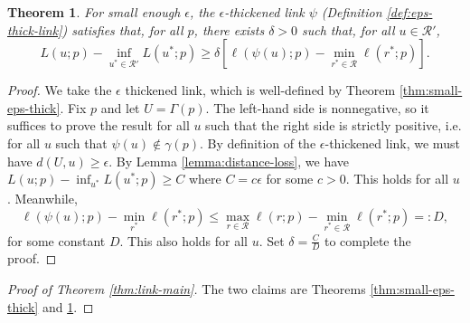 \documentclass[11pt]{article}
\newcommand{\R}{\mathcal{R}}
\newtheorem{theorem}{Theorem}
\begin{document}
\begin{theorem} \label{thm:app-eps-thick-sep}
  For small enough $\epsilon$, the $\epsilon$-thickened link $\psi$ (Definition \ref{def:eps-thick-link}) satisfies that, for all $p$, there exists $\delta > 0$ such that, for all $u \in \R'$,
    \[ L(u;p) - \inf_{u^* \in \R'} L(u^*;p) \geq \delta \left[ \ell(\psi(u);p) - \min_{r^* \in \R} \ell(r^*;p) \right] . \]
\end{theorem}
\begin{proof}
  We take the $\epsilon$ thickened link, which is well-defined by Theorem \ref{thm:small-eps-thick}.
  Fix $p$ and let $U = \Gamma(p)$.
  The left-hand side is nonnegative, so it suffices to prove the result for all $u$ such that the right side is strictly positive, i.e. for all $u$ such that $\psi(u) \not\in \gamma(p)$.
  By definition of the $\epsilon$-thickened link, we must have $d(U,u) \geq \epsilon$.
  By Lemma \ref{lemma:distance-loss}, we have $L(u;p) - \inf_{u^*} L(u^*;p) \geq C$ where $C = c\epsilon$ for some $c > 0$.
  This holds for all $u$.
  Meanwhile,
    \[ \ell(\psi(u);p) - \min_{r^*} \ell(r^*;p) \leq \max_{r \in \R} \ell(r;p) - \min_{r^* \in \R} \ell(r^*;p) =: D, \]
  for some constant $D$.
  This also holds for all $u$.
  Set $\delta = \frac{C}{D}$ to complete the proof.
\end{proof}

\begin{proof}[Proof of Theorem \ref{thm:link-main}]
  The two claims are Theorems \ref{thm:small-eps-thick} and \ref{thm:app-eps-thick-sep}.
\end{proof}
\end{document}
